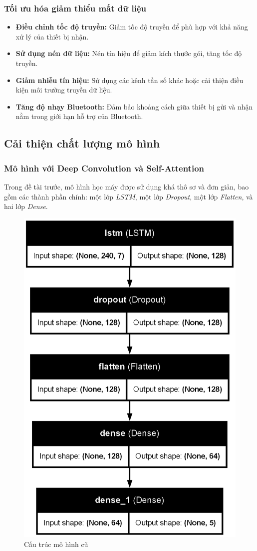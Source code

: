 \subsubsection{Tối ưu hóa giảm thiểu mất dữ liệu}
\begin{itemize}
    \item \textbf{Điều chỉnh tốc độ truyền:} Giảm tốc độ truyền để phù hợp với khả năng xử lý của thiết bị nhận.
    \item \textbf{Sử dụng nén dữ liệu:} Nén tín hiệu để giảm kích thước gói, tăng tốc độ truyền.
    \item \textbf{Giảm nhiễu tín hiệu:} Sử dụng các kênh tần số khác hoặc cải thiện điều kiện môi trường truyền dữ liệu.
    \item \textbf{Tăng độ nhạy Bluetooth:} Đảm bảo khoảng cách giữa thiết bị gửi và nhận nằm trong giới hạn hỗ trợ của Bluetooth.
\end{itemize}





\subsection{Cải thiện chất lượng mô hình}
\subsubsection{Mô hình với Deep Convolution và Self-Attention}

Trong đề tài trước, mô hình học máy được sử dụng khá thô sơ và đơn giản, bao gồm các thành phần chính: một lớp \textit{LSTM}, một lớp \textit{Dropout}, một lớp \textit{Flatten}, và hai lớp \textit{Dense}. 

\begin{figure}[H]
    \centering
    \includegraphics[width=0.5\linewidth]{Images/Improved methods/old_model_plot.png}
    \caption{Cấu trúc mô hình cũ}
    \label{fig:old-model}
\end{figure}

